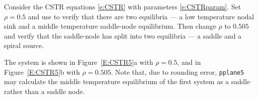 \documentclass{ximera}
\begin{document}
\begin{computerExercise}  \label{E:CSTR5}
Consider the CSTR equations \eqref{e:CSTR} with parameters 
\eqref{e:CSTRparam}. Set $\rho=0.5$ and use 
{\pplane} to verify 
that there are two equilibria --- a low temperature nodal sink 
and a middle temperature saddle-node equilibrium.  Then change 
$\rho$ to $0.505$ and verify that the saddle-node has split 
into two equilibria --- a saddle and a spiral source.

\begin{solution}

The system is shown in Figure~\ref{E:CSTR5}a with $\rho = 0.5$, and in
Figure~\ref{E:CSTR5}b with $\rho = 0.505$.  Note that, due to rounding
error, {\tt pplane5} may calculate the middle temperature equilibrium of
the first system as a saddle rather than a saddle node.  

\begin{figure}[htb]
                       \centerline{%
                       }
\end{figure}

\end{solution}
\end{computerExercise}
\end{document}
